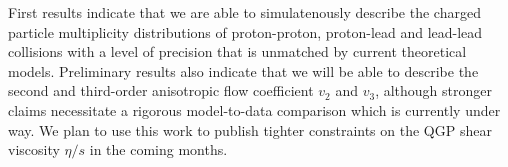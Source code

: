 \documentclass[aps,prc,reprint,amsmath,nofootinbib]{revtex4-1}
\begin{document}
First results indicate that we are able to simulatenously describe the charged particle multiplicity distributions of proton-proton, proton-lead and lead-lead collisions 
with a level of precision that is unmatched by current theoretical models. Preliminary results also indicate that we will be able to describe the second and third-order
anisotropic flow coefficient $v_2$ and $v_3$, although stronger claims necessitate a rigorous model-to-data comparison which is currently under way. We plan to use this work
to publish tighter constraints on the QGP shear viscosity $\eta/s$ in the coming months.





\end{document}
